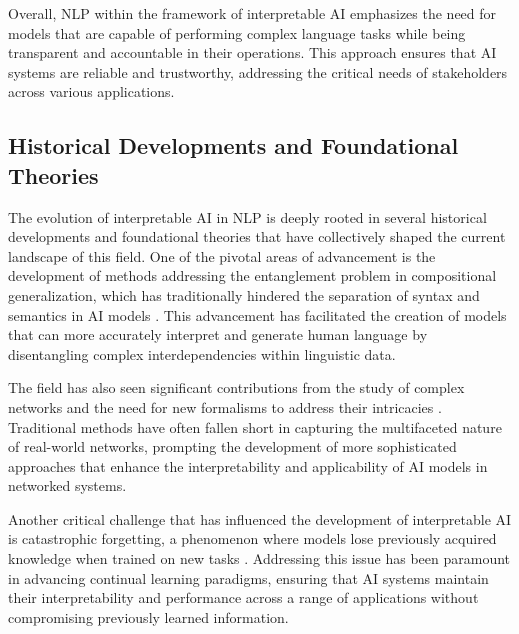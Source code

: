 Overall, NLP within the framework of interpretable AI emphasizes the need for models that are capable of performing complex language tasks while being transparent and accountable in their operations. This approach ensures that AI systems are reliable and trustworthy, addressing the critical needs of stakeholders across various applications.



\subsection{Historical Developments and Foundational Theories} \label{subsec:Historical Developments and Foundational Theories}



The evolution of interpretable AI in NLP is deeply rooted in several historical developments and foundational theories that have collectively shaped the current landscape of this field. One of the pivotal areas of advancement is the development of methods addressing the entanglement problem in compositional generalization, which has traditionally hindered the separation of syntax and semantics in AI models \cite{zheng2023layerwiserepresentationfusioncompositional}. This advancement has facilitated the creation of models that can more accurately interpret and generate human language by disentangling complex interdependencies within linguistic data.



The field has also seen significant contributions from the study of complex networks and the need for new formalisms to address their intricacies \cite{shakarian2022reasoningcomplexnetworkslogic}. Traditional methods have often fallen short in capturing the multifaceted nature of real-world networks, prompting the development of more sophisticated approaches that enhance the interpretability and applicability of AI models in networked systems.



Another critical challenge that has influenced the development of interpretable AI is catastrophic forgetting, a phenomenon where models lose previously acquired knowledge when trained on new tasks \cite{chitale2023taskarithmeticloracontinual}. Addressing this issue has been paramount in advancing continual learning paradigms, ensuring that AI systems maintain their interpretability and performance across a range of applications without compromising previously learned information.



